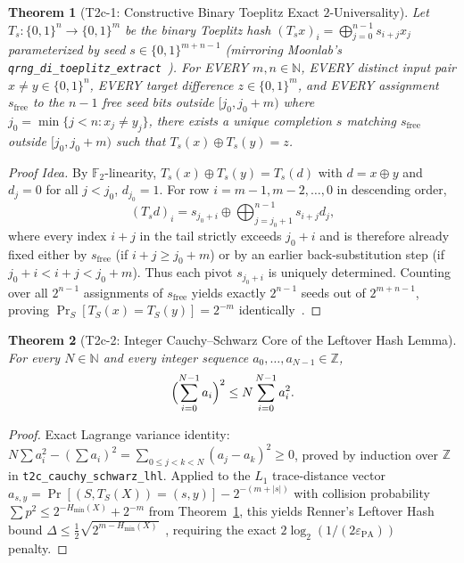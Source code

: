\documentclass[11pt,reqno]{amsart}
\newtheorem{theorem}{Theorem}[section]
\theoremstyle{definition}
\newcommand{\F}{\mathbb{F}}
\newcommand{\Z}{\mathbb{Z}}
\newcommand{\code}[1]{\texttt{\small #1}}
\begin{document}
\begin{theorem}[T2c-1: Constructive Binary Toeplitz Exact $2$-Universality]
\label{thm:t2c1}
Let $T_s : \{0,1\}^n \to \{0,1\}^m$ be the binary Toeplitz hash $(T_s x)_i = \bigoplus_{j=0}^{n-1} s_{i+j} x_j$ parameterized by seed $s \in \{0,1\}^{m+n-1}$ (mirroring Moonlab's \code{qrng\_di\_toeplitz\_extract}~\cite{tsotchke_moonlab}).
For EVERY $m, n \in \mathbb{N}$, EVERY distinct input pair $x \ne y \in \{0,1\}^n$, EVERY target difference $z \in \{0,1\}^m$, and EVERY assignment $s_{\mathrm{free}}$ to the $n-1$ free seed bits outside $[j_0, j_0 + m)$ where $j_0 = \min\{j < n : x_j \ne y_j\}$, there exists a \emph{unique} completion $s$ matching $s_{\mathrm{free}}$ outside $[j_0, j_0 + m)$ such that $T_s(x) \oplus T_s(y) = z$.
\end{theorem}
\begin{proof}[Proof Idea]
By $\F_2$-linearity, $T_s(x) \oplus T_s(y) = T_s(d)$ with $d = x \oplus y$ and $d_j = 0$ for all $j < j_0$, $d_{j_0} = 1$.
For row $i = m - 1, m - 2, \dots, 0$ in descending order,
\[
  (T_s d)_i = s_{j_0 + i} \oplus \bigoplus_{j = j_0 + 1}^{n - 1} s_{i + j} d_j,
\]
where every index $i + j$ in the tail strictly exceeds $j_0 + i$ and is therefore already fixed either by $s_{\mathrm{free}}$ (if $i + j \ge j_0 + m$) or by an earlier back-substitution step (if $j_0 + i < i + j < j_0 + m$). Thus each pivot $s_{j_0 + i}$ is uniquely determined. Counting over all $2^{n-1}$ assignments of $s_{\mathrm{free}}$ yields exactly $2^{n-1}$ seeds out of $2^{m+n-1}$, proving $\Pr_S[T_S(x) = T_S(y)] = 2^{-m}$ identically~\cite{mansour1993}.
\end{proof}

\begin{theorem}[T2c-2: Integer Cauchy--Schwarz Core of the Leftover Hash Lemma]
\label{thm:t2c2}
For every $N \in \mathbb{N}$ and every integer sequence $a_0,\dots,a_{N-1} \in \Z$,
\[
  \Bigl(\sum_{i=0}^{N-1} a_i\Bigr)^2 \le N \sum_{i=0}^{N-1} a_i^2.
\]
\end{theorem}
\begin{proof}
Exact Lagrange variance identity: $N \sum a_i^2 - (\sum a_i)^2 = \sum_{0 \le j < k < N} (a_j - a_k)^2 \ge 0$, proved by induction over $\Z$ in \code{t2c\_cauchy\_schwarz\_lhl}.
Applied to the $L_1$ trace-distance vector $a_{s,y} = \Pr[(S, T_S(X))=(s,y)] - 2^{-(m+|s|)}$ with collision probability $\sum p^2 \le 2^{-H_{\min}(X)} + 2^{-m}$ from Theorem~\ref{thm:t2c1}, this yields Renner's Leftover Hash bound $\Delta \le \frac{1}{2}\sqrt{2^{m - H_{\min}(X)}}$~\cite{hastad1999,renner2008}, requiring the exact $2\log_2(1/(2\varepsilon_{\mathrm{PA}}))$ penalty.
\end{proof}
\end{document}
